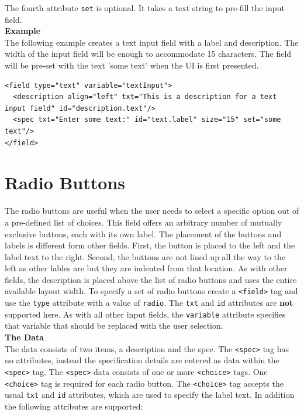 The fourth attribute \texttt{set} is optional. It takes a text string to
pre-fill the input field.\\

\textbf{Example}\\

The following example creates a text input field with a label and
description. The width of the input field will be enough to accommodate
15 characters. The field will be pre-set with the text 'some text' when
the UI is first presented.\\

\footnotesize
\begin{verbatim}
<field type="text" variable="textInput">
  <description align="left" txt="This is a description for a text input field" id="description.text"/>
  <spec txt="Enter some text:" id="text.label" size="15" set="some text"/>
</field>
\end{verbatim}
\normalsize

\section{Radio Buttons}

The radio buttons are useful when the user needs to select a specific
option out of a pre-defined list of choices. This field offers an
arbitrary number of mutually exclusive buttons, each with its own label.
The placement of the buttons and labels is different form other fields.
First, the button is placed to the left and the label text to the right.
Second, the buttons are not lined up all the way to the left as other
lables are but they are indented from that location. As with other
fields, the description is placed above the list of radio buttons and
uses the entire available layout width. To specify a set of radio
buttons create a \texttt{<field>} tag and use the \texttt{type}
attribute with a value of \texttt{radio}. The \texttt{txt} and
\texttt{id} attributes are \textbf{not} supported here. As with all
other input fields, the \texttt{variable} attribute specifies that
variable that should be replaced with the user selection.\\

\textbf{The Data}\\

The data consists of two items, a description and the spec. The
\texttt{<spec>} tag has no attributes, instead the specification details
are entered as data within the \texttt{<spec>} tag. The \texttt{<spec>}
data consists of one or more \texttt{<choice>} tags. One
\texttt{<choice>} tag is required for each radio button. The
\texttt{<choice>} tag accepts the usual \texttt{txt} and \texttt{id}
attributes, which are used to specify the label text. In addition the
following attributes are supported:\\

